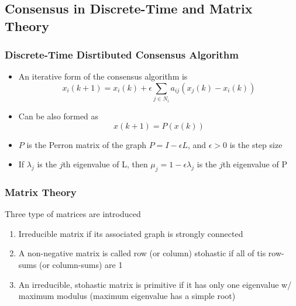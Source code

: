 \documentclass{beamer}
\begin{document}
\subsection{Consensus in Discrete-Time and Matrix Theory}

\begin{frame}
\frametitle{Discrete-Time Disrtibuted Consensus Algorithm}
\begin{itemize}
\item An iterative form of the consensus algorithm is
\begin{equation*}
x_i(k+1)=x_i(k)+\epsilon \sum_{j\in N_i}a_{ij}(x_j(k)-x_i(k))
\end{equation*}
\item Can be also formed as 
\begin{equation*}
x(k+1)=P(x(k))
\end{equation*}
\item $P$ is the Perron matrix of the graph $P=I-\epsilon L$, and $\epsilon>0$ is the step size 
\item If $\lambda_j$ is the $j$th eigenvalue of L, then $\mu_j = 1-\epsilon \lambda_j$ is the $j$th eigenvalue of P 
\end{itemize}
\end{frame}


\begin{frame}
\frametitle{Matrix Theory}
Three type of matrices are introduced
\begin{enumerate}
\item Irreducible  matrix if its associated graph is strongly connected \vspace{.2cm}
\item A non-negative matrix is called row (or column) stohastic if all of tis row-sums (or column-sums) are 1 \vspace{.2cm}
\item An irreducible, stohastic matrix is primitive if it has only one eigenvalue w/ maximum modulus (maximum eigenvalue has a simple root) 
\end{enumerate}
\end{frame}

\end{document}
